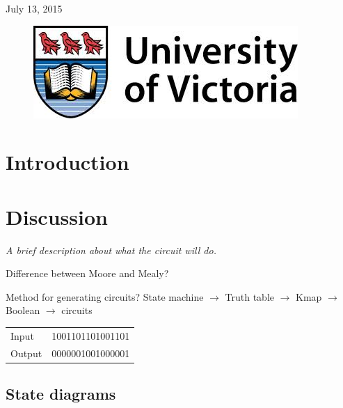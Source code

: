 \documentclass[11pt]{article}
\begin{document}
\begin{titlepage}
{\large July 13, 2015}\\ %

\begin{figure}[b]	 %
	\centering
	\includegraphics[scale=0.3]{UVic_logo}
\end{figure}

\end{titlepage}


\section{Introduction}


\section{Discussion}
{\em A brief description about what the circuit will do.
	
	Difference between Moore and Mealy?
	
	Method for generating circuits? State machine $\rightarrow$ Truth table $\rightarrow$ Kmap $\rightarrow$ Boolean $\rightarrow$ circuits}

\begin{table}[htpb]
	\centering
	\begin{tabular}{l c}
		Input & 1001101101001101 \\
		Output & 0000001001000001 \\
	\end{tabular}
\end{table}

\subsection{State diagrams}
\end{document}

